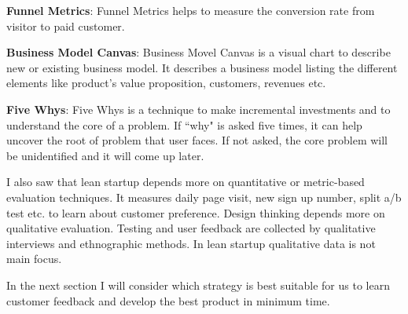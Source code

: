\textbf{Funnel Metrics}: Funnel Metrics helps to measure the conversion rate from visitor to paid customer. \cite[p.~112]{leanstartup}


\textbf{Business Model Canvas}: Business Movel Canvas is a visual chart to describe new or existing business model. It describes a business model listing the different elements like product's value proposition, customers, revenues etc.

\textbf{Five Whys}: Five Whys is a technique to make incremental investments and to understand the core of a problem. If ``why" is asked five times, it can help uncover the root of problem that user faces. If not asked, the core problem will be unidentified and it will come up later.\cite[p.~212]{leanstartup}












I also saw that lean startup depends more on quantitative or metric-based evaluation techniques. It measures daily page visit, new sign up number, split a/b test etc. to learn about customer preference. Design thinking depends more on qualitative evaluation. Testing and user feedback are collected by qualitative interviews and ethnographic methods. In lean startup qualitative data is not main focus.

In the next section I will consider which strategy is best suitable for us to learn customer feedback and develop the best product in minimum time.